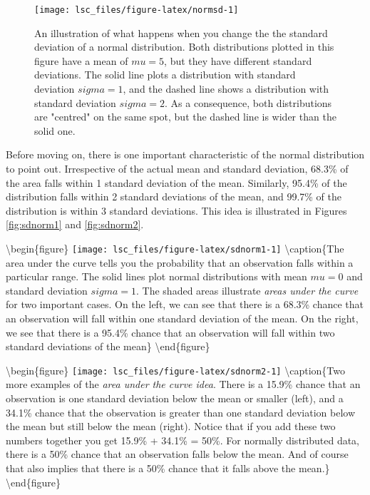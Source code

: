 \documentclass[
  11pt,
  a4paper,
  twoside,symmetric,openright]{book}
\theoremstyle{break}
\theoremstyle{break}
\begin{document}
\begin{figure}

{\centering \texttt{[image: lsc\_files/figure-latex/normsd-1]} 

}

\caption{An illustration of what happens when you change the the standard deviation of a normal distribution. Both distributions plotted in this figure have a mean of $mu = 5$, but they have different standard deviations. The solid line plots a distribution with standard deviation $sigma=1$, and the dashed line shows a distribution with standard deviation $sigma = 2$. As a consequence, both distributions are "centred" on the same spot, but the dashed line is wider than the solid one.}\label{fig:normsd}
\end{figure}

Before moving on, there is one important characteristic of the normal distribution to point out. Irrespective of the actual mean and standard deviation, 68.3\% of the area falls within 1 standard deviation of the mean. Similarly, 95.4\% of the distribution falls within 2 standard deviations of the mean, and 99.7\% of the distribution is within 3 standard deviations. This idea is illustrated in Figures \ref{fig:sdnorm1} and \ref{fig:sdnorm2}.

\textbackslash begin\{figure\}
\texttt{[image: lsc\_files/figure-latex/sdnorm1-1]} \textbackslash caption\{The area under the curve tells you the probability that an observation falls within a particular range. The solid lines plot normal distributions with mean \(mu=0\) and standard deviation \(sigma=1\). The shaded areas illustrate \emph{areas under the curve} for two important cases. On the left, we can see that there is a 68.3\% chance that an observation will fall within one standard deviation of the mean. On the right, we see that there is a 95.4\% chance that an observation will fall within two standard deviations of the mean\}\label{fig:sdnorm1}
\textbackslash end\{figure\}

\textbackslash begin\{figure\}
\texttt{[image: lsc\_files/figure-latex/sdnorm2-1]} \textbackslash caption\{Two more examples of the \emph{area under the curve idea}. There is a 15.9\% chance that an observation is one standard deviation below the mean or smaller (left), and a 34.1\% chance that the observation is greater than one standard deviation below the mean but still below the mean (right). Notice that if you add these two numbers together you get 15.9\% + 34.1\% = 50\%. For normally distributed data, there is a 50\% chance that an observation falls below the mean. And of course that also implies that there is a 50\% chance that it falls above the mean.\}\label{fig:sdnorm2}
\textbackslash end\{figure\}
\end{document}
